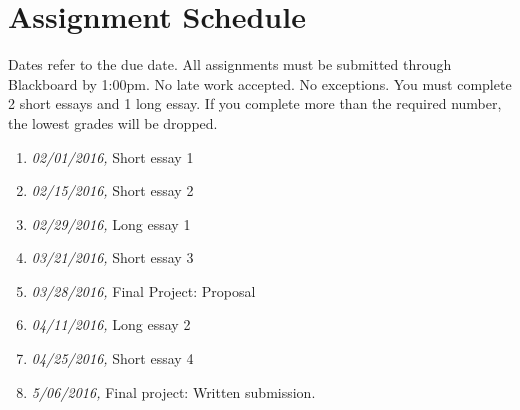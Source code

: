 \documentclass[article,oneside]{memoir}
\begin{document}
\section{ Assignment Schedule}
Dates refer to the due date. All assignments must be submitted through Blackboard by 1:00pm. No late work accepted. No exceptions. You must complete 2 short essays and 1 long essay. If you complete more than the required number, the lowest grades will be dropped.
\begin{enumerate}
\item \textit{02/01/2016,} Short essay 1
\item \textit{02/15/2016,} Short essay 2
\item \textit{02/29/2016,} Long essay 1
\item \textit{03/21/2016,} Short essay 3
\item \textit{03/28/2016,} Final Project: Proposal
\item \textit{04/11/2016,} Long essay 2
\item \textit{04/25/2016,} Short essay 4
\item \textit{5/06/2016,} Final project: Written submission.
\end{enumerate}




\end{document}
